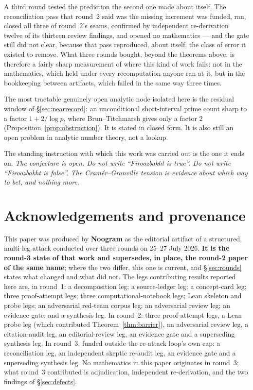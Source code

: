 \documentclass[11pt,a4paper]{article}
\theoremstyle{plain}
\theoremstyle{definition}
\theoremstyle{remark}
\begin{document}
A third round tested the prediction the second one made about itself. The reconciliation pass
that round~2 said was the missing increment was funded, ran, closed all three of round~2's
seams, confirmed by independent re-derivation twelve of its thirteen review findings, and
opened no mathematics --- and the gate still did not clear, because that pass reproduced, about
itself, the class of error it existed to remove. What three rounds bought, beyond the theorems
above, is therefore a fairly sharp measurement of where this kind of work fails: not in the
mathematics, which held under every recomputation anyone ran at it, but in the bookkeeping
between artifacts, which failed in the same way three times.

The most tractable genuinely open analytic node isolated here is the residual window of
\S\ref{sec:nearrecord}: an unconditional short-interval prime count sharp to a factor
$1 + 2/\log p$, where Brun--Titchmarsh gives only a factor $2$
(Proposition~\ref{prop:obstruction}). It is stated in closed form. It is also still an open
problem in analytic number theory, not a lookup.

The standing instruction with which this work was carried out is the one it ends on. \emph{The
conjecture is open. Do not write ``Firoozbakht is true''. Do not write ``Firoozbakht is
false''. The Cram\'er--Granville tension is evidence about which way to bet, and nothing
more.}

\section*{Acknowledgements and provenance}

This paper was produced by \textbf{Noogram} as the editorial artifact of a structured,
multi-leg attack conducted over three rounds on 25--27 July 2026. \textbf{It is the round-3
state of that work and supersedes, in place, the round-2 paper of the same name}; where the two
differ, this one is current, and \S\ref{sec:rounds} states what changed and what did not. The
legs contributing results reported here are, in round~1: a decomposition leg; a source-ledger
leg; a concept-card leg; three proof-attempt legs; three computational-notebook legs; Lean
skeleton and probe legs; an adversarial red-team corpus leg; an adversarial review leg; an
evidence gate; and a synthesis leg. In round~2: three proof-attempt legs, a Lean probe leg
(which contributed Theorem~\ref{thm:barrier}), an adversarial review leg, a citation-audit leg,
an editorial-review leg, an evidence gate and a superseding synthesis leg. In round~3, funded
outside the re-attack loop's own cap: a reconciliation leg, an independent skeptic re-audit
leg, an evidence gate and a superseding synthesis leg. No mathematics in this paper originates
in round~3; what round~3 contributed is adjudication, independent re-derivation, and the two
findings of \S\ref{sec:defects}.
\end{document}
